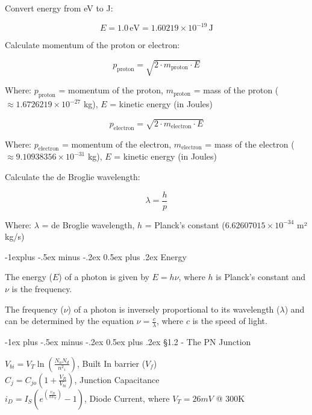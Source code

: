 \documentclass[10pt,landscape]{article}
\makeatletter
\renewcommand{\section}{\@startsection{section}{1}{0mm}%
                                {-1ex plus -.5ex minus -.2ex}%
                                {0.5ex plus .2ex}%
                                {\normalfont\large\bfseries}}
\renewcommand{\subsection}{\@startsection{subsection}{2}{0mm}%
                                {-1explus -.5ex minus -.2ex}%
                                {0.5ex plus .2ex}%
                                {\normalfont\normalsize\bfseries}}
\makeatother
\begin{document}
\begin{multicols}{3}
Convert energy from eV to J:

\[ E = 1.0 \, \text{eV} = 1.60219 \times 10^{-19} \, \text{J} \]

Calculate momentum of the proton or electron:

\[
p_{\text{proton}} = \sqrt{2 \cdot m_{\text{proton}} \cdot E}
\]

Where:
\( p_{\text{proton}} \) = momentum of the proton, 
\( m_{\text{proton}} \) = mass of the proton (\( \approx 1.6726219 \times 10^{-27} \) kg), 
\( E \) = kinetic energy (in Joules)

\[
p_{\text{electron}} = \sqrt{2 \cdot m_{\text{electron}} \cdot E}
\]

Where:
\( p_{\text{electron}} \) = momentum of the electron, 
\( m_{\text{electron}} \) = mass of the electron (\( \approx 9.10938356 \times 10^{-31} \) kg), 
\( E \) = kinetic energy (in Joules)



Calculate the de Broglie wavelength:

\[
\lambda = \frac{h}{p}
\]

Where:
\( \lambda \) = de Broglie wavelength, 
\( h \) = Planck's constant (\(6.62607015 \times 10^{-34} \) m² kg/s)

\subsection{Energy}

The energy (\(E\)) of a photon is given by \(E = h\nu\), where \(h\) is Planck's constant and \(\nu\) is the frequency.

The frequency (\(\nu\)) of a photon is inversely proportional to its wavelength (\(\lambda\)) and can be determined by the equation \(\nu = \frac{c}{\lambda}\), where \(c\) is the speed of light.




\section{\S1.2 - The PN Junction}

$V_{bi} = V_T\ln\left(\frac{N_a N_d}{{n^2}_i}\right)$, Built In barrier ($V_f$)\\
$C_j = C_{jo}\left(1+\frac{V_R}{V_{bi}}\right)$, Junction Capacitance\\
$i_D = I_S\left(e^{\left(\frac{v_D}{nV_T}\right)}-1\right)$, Diode Current, where $V_T = 26mV$ @ 300K\\


\end{multicols}
\end{document}
